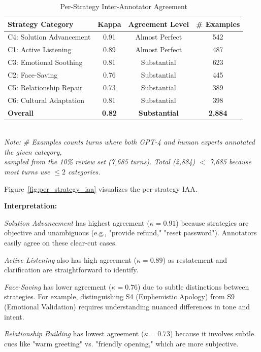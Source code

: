 \documentclass[11pt]{article}
\begin{document}
\begin{table}[t]
\centering
\caption{Per-Strategy Inter-Annotator Agreement}
\label{tab:per_strategy_iaa}
\begin{tabular}{lccc}
\toprule
\textbf{Strategy Category} & \textbf{Kappa} & \textbf{Agreement Level} & \textbf{\# Examples} \\
\midrule
C4: Solution Advancement & 0.91 & Almost Perfect & 542 \\
C1: Active Listening & 0.89 & Almost Perfect & 487 \\
C3: Emotional Soothing & 0.81 & Substantial & 623 \\
C2: Face-Saving & 0.76 & Substantial & 445 \\
C5: Relationship Repair & 0.73 & Substantial & 389 \\
C6: Cultural Adaptation & 0.81 & Substantial & 398 \\
\midrule
\textbf{Overall} & \textbf{0.82} & \textbf{Substantial} & \textbf{2,884} \\
\bottomrule
\end{tabular}
\smallskip
\\
\footnotesize{\textit{Note: \# Examples counts turns where both GPT-4 and human experts annotated the given category,}}
\\
\footnotesize{\textit{sampled from the 10\% review set (7,685 turns). Total (2,884) $<$ 7,685 because most turns use $\le 2$ categories.}}

Figure~\ref{fig:per_strategy_iaa} visualizes the per-strategy IAA.



\textbf{Interpretation:}

\textit{Solution Advancement} has highest agreement ($\kappa=0.91$) because strategies are objective and unambiguous (e.g., "provide refund," "reset password"). Annotators easily agree on these clear-cut cases.

\textit{Active Listening} also has high agreement ($\kappa=0.89$) as restatement and clarification are straightforward to identify.

\textit{Face-Saving} has lower agreement ($\kappa=0.76$) due to subtle distinctions between strategies. For example, distinguishing S4 (Euphemistic Apology) from S9 (Emotional Validation) requires understanding nuanced differences in tone and intent.

\textit{Relationship Building} has lowest agreement ($\kappa=0.73$) because it involves subtle cues like "warm greeting" vs. "friendly opening," which are more subjective.


\end{table}
\end{document}
